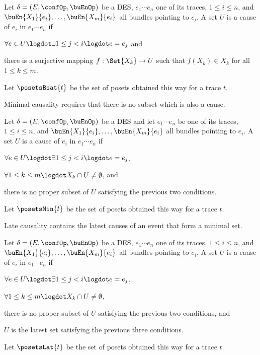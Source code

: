 \documentclass[runningheads,a4paper]{llncs}
\begin{document}
\begin{definition}
	Let $ \delta = \left( E, \confOp, \buEnOp \right) $ be a DES, $ e_1 \cdots e_n $ one of its traces, $ 1 \leq i \leq n $, and $ \buEn{X_1}{e_i}, \ldots, \buEn{X_m}{e_i} $ all bundles pointing to $ e_i $.
	A set $ U $ is a cause of $ e_i $ in $ e_1 \cdots e_n $ if
	\begin{compactitem}
		\item $ \forall e \in U \logdot \exists 1 \leq j < i \logdot e = e_j $ and
		\item there is a surjective mapping $ f : \Set{ X_k } \to U $ such that $ f\!\left( X_k \right) \in X_k $ for all $ 1 \leq k \leq m $.
	\end{compactitem}
	Let $ \posetsBsat{t} $ be the set of posets obtained this way for a trace $ t $.
\end{definition}

Minimal causality requires that there is no subset which is also a cause.

\begin{definition}
	Let $ \delta = \left( E, \confOp, \buEnOp \right) $ be a DES and let $ e_1 \cdots e_n $ be  one of its traces, $ 1 \leq i \leq n $, and $ \buEn{X_1}{e_i}, \ldots, \buEn{X_m}{e_i} $ all bundles pointing to $ e_i $.
	A set $ U $ is a cause of $ e_i $ in $ e_1 \cdots e_n $ if
	\begin{compactitem}
		\item $ \forall e \in U \logdot \exists 1 \leq j < i \logdot e = e_j $,
		\item $ \forall 1 \leq k \leq m \logdot X_k \cap U \neq \emptyset $, and
		\item there is no proper subset of $ U $ satisfying the previous two conditions.	
	\end{compactitem}
	Let $ \posetsMin{t} $ be the set of posets obtained this way for a trace $ t $.
\end{definition}

Late causality contains the latest causes of an event that form a minimal set.

\begin{definition}
	Let $ \delta = \left( E, \confOp, \buEnOp \right) $ be a DES, $ e_1 \cdots e_n $ one of its traces, $ 1 \leq i \leq n $, and $ \buEn{X_1}{e_i}, \ldots, \buEn{X_m}{e_i} $ all bundles pointing to $ e_i $.
	A set $ U $ is a cause of $ e_i $ in $ e_1 \cdots e_n $ if
	\begin{compactitem}
		\item $ \forall e \in U \logdot \exists 1 \leq j < i \logdot e = e_j $,
		\item $ \forall 1 \leq k \leq m \logdot X_k \cap U \neq \emptyset $,
		\item there is no proper subset of $ U $ satisfying the previous two conditions, and
		\item $ U $ is the latest set satisfying the previous three conditions.	
	\end{compactitem}
	Let $ \posetsLat{t} $ be the set of posets obtained this way for a trace $ t $.
\end{definition}
\end{document}
